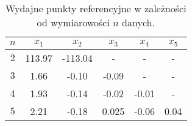\begin{table}[h]
	\centering
	\begin{tabular}{| c | c | c | c | c | c |}
		\hline
		$ n $ & $ x_1 $ & $ x_2 $ & $ x_3 $ & $ x_4 $ & $ x_5 $ \\ \hline
		$ 2 $ & 113.97 & -113.04 & - & - & -  \\ \hline
		$ 3 $ & 1.66 & -0.10 & -0.09 & - & - \\ \hline
		$ 4 $ & 1.93 & -0.14 & -0.02 & -0.01 & - \\ \hline
		$ 5 $ & 2.21 & -0.18 & 0.025 & -0.06 & 0.04 \\ \hline
	\end{tabular}
	\caption{Wydajne punkty referencyjne w zależności od wymiarowości $ n $ danych.}\label{ti:eg-ref-p}
\end{table}